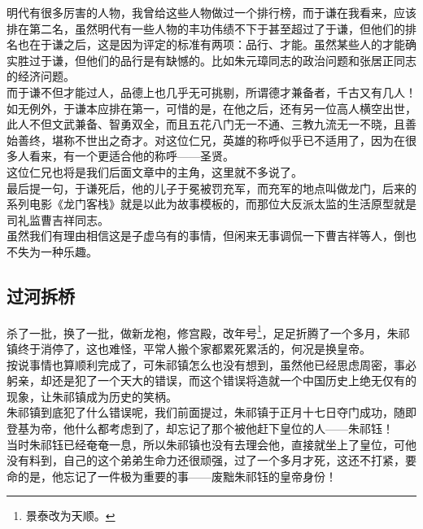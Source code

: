 \begin{multicols}{\theparacolNo}
明代有很多厉害的人物，我曾给这些人物做过一个排行榜，而于谦在我看来，应该排在第二名，虽然明代有一些人物的丰功伟绩不下于甚至超过了于谦，但他们的排名也在于谦之后，这是因为评定的标准有两项：品行、才能。虽然某些人的才能确实胜过于谦，但他们的品行是有缺憾的。比如朱元璋同志的政治问题和张居正同志的经济问题。\\

而于谦不但才能过人，品德上也几乎无可挑剔，所谓德才兼备者，千古又有几人！\\

如无例外，于谦本应排在第一，可惜的是，在他之后，还有另一位高人横空出世，此人不但文武兼备、智勇双全，而且五花八门无一不通、三教九流无一不晓，且善始善终，堪称不世出之奇才。对这位仁兄，英雄的称呼似乎已不适用了，因为在很多人看来，有一个更适合他的称呼——圣贤。\\

这位仁兄也将是我们后面文章中的主角，这里就不多说了。\\

最后提一句，于谦死后，他的儿子于冕被罚充军，而充军的地点叫做龙门，后来的系列电影《龙门客栈》就是以此为故事模板的，而那位大反派太监的生活原型就是司礼监曹吉祥同志。\\

虽然我们有理由相信这是子虚乌有的事情，但闲来无事调侃一下曹吉祥等人，倒也不失为一种乐趣。\\

\subsection{过河拆桥}
杀了一批，换了一批，做新龙袍，修宫殿，改年号\footnote{景泰改为天顺。}，足足折腾了一个多月，朱祁镇终于消停了，这也难怪，平常人搬个家都累死累活的，何况是换皇帝。\\

按说事情也算顺利完成了，可朱祁镇怎么也没有想到，虽然他已经思虑周密，事必躬亲，却还是犯了一个天大的错误，而这个错误将造就一个中国历史上绝无仅有的现象，让朱祁镇成为历史的笑柄。\\

朱祁镇到底犯了什么错误呢，我们前面提过，朱祁镇于正月十七日夺门成功，随即登基为帝，他什么都考虑到了，却忘记了那个被他赶下皇位的人——朱祁钰！\\

当时朱祁钰已经奄奄一息，所以朱祁镇也没有去理会他，直接就坐上了皇位，可他没有料到，自己的这个弟弟生命力还很顽强，过了一个多月才死，这还不打紧，要命的是，他忘记了一件极为重要的事——废黜朱祁钰的皇帝身份！\\


\end{multicols}
